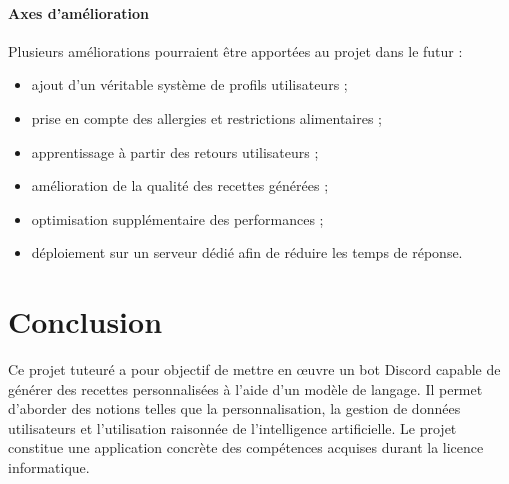\documentclass[12pt]{article}
\begin{document}
        \paragraph{Axes d’amélioration}
            Plusieurs améliorations pourraient être apportées au projet dans le futur :
            \begin{itemize}
                \item ajout d’un véritable système de profils utilisateurs ;
                \item prise en compte des allergies et restrictions alimentaires ;
                \item apprentissage à partir des retours utilisateurs ;
                \item amélioration de la qualité des recettes générées ;
                \item optimisation supplémentaire des performances ;
                \item déploiement sur un serveur dédié afin de réduire les temps de réponse.
            \end{itemize}         
    \section{Conclusion}

        Ce projet tuteuré a pour objectif de mettre en œuvre un bot Discord capable de générer des recettes personnalisées à l’aide d’un modèle de langage.
        Il permet d’aborder des notions telles que la personnalisation, la gestion de données utilisateurs et l’utilisation raisonnée de l’intelligence artificielle.
        Le projet constitue une application concrète des compétences acquises durant la licence informatique.

        
\end{document}
